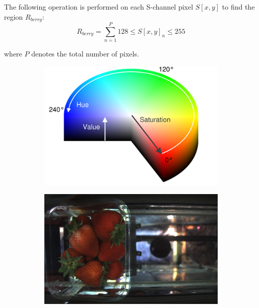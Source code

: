 \documentclass[fleqn,twoside,12pt]{report}
\begin{document}
The following operation is performed on each S-channel pixel $S[x,y]$ to find the region $R_{berry}$:
\begin{equation}
R_{berry} = \sum_{n=1}^{P} 128 \leq S[x,y]_n \leq 255
\end{equation}

where $P$ denotes the total number of pixels. 


\begin{figure}[ht]
	\centering
	\begin{subfigure}{.4\textwidth}
		\centering
		\includegraphics[width=.9\linewidth]{hue_sat.png}
		\caption{}
		\label{fig:hue_sat}
	\end{subfigure}%
	\begin{subfigure}{.4\textwidth}
		\centering
		\includegraphics[width=.9\linewidth]{bg_example.png}
		\caption{}
		\label{fig:bg_example}
	\end{subfigure}%


\end{figure}
\end{document}
